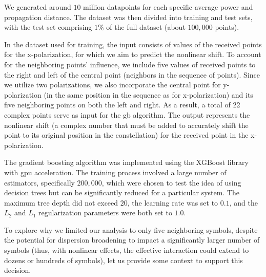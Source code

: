 We generated around $10$ million datapoints for each specific average power and propagation distance. The dataset was then divided into training and test sets, with the test set comprising $1\%$ of the full dataset (about $100,000$ points).

In the dataset used for training, the input consists of values of the received points for the x-polarization, for which we aim to predict the nonlinear shift. To account for the neighboring points' influence, we include five values of received points to the right and left of the central point (neighbors in the sequence of points). Since we utilize two polarizations, we also incorporate the central point for y-polarization (in the same position in the sequence as for x-polarization) and its five neighboring points on both the left and right. As a result, a total of 22 complex points serve as input for the \acrshort{gb} algorithm. The output represents the nonlinear shift (a complex number that must be added to accurately shift the point to its original position in the constellation) for the received point in the x-polarization.

The gradient boosting algorithm was implemented using the XGBoost library\cite{Chen:2016:XST:2939672.2939785} with \acrshort{gpu} acceleration. The training process involved a large number of estimators, specifically $200,000$, which were chosen to test the idea of using decision trees but can be significantly reduced for a particular system. The maximum tree depth did not exceed $20$, the learning rate was set to $0.1$, and the $L_2$ and $L_1$ regularization parameters were both set to $1.0$.

To explore why we limited our analysis to only five neighboring symbols, despite the potential for dispersion broadening to impact a significantly larger number of symbols (thus, with nonlinear effects, the effective interaction could extend to dozens or hundreds of symbols), let us provide some context to support this decision.

